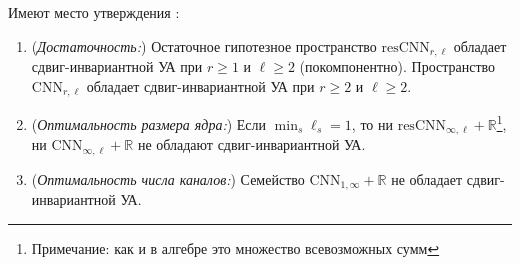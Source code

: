 \documentclass[../NDCNNAI_main.tex]{subfiles}
\begin{document}
\begin{theorem}
\label{thm:lls_main}
Имеют место утверждения \cite{Li_Lin_Shen2022}:
\begin{enumerate}
\item (\emph{Достаточность:}) Остаточное гипотезное пространство $\mathrm{resCNN}_{r,\ell}$ обладает сдвиг-инвариантной УА при $r\ge 1$ и $\ell\ge 2$ (покомпонентно).
Пространство $\mathrm{CNN}_{r,\ell}$ обладает сдвиг-инвариантной УА при $r\ge 2$ и $\ell\ge 2$.
\item (\emph{Оптимальность размера ядра:}) Если $\min_s \ell_s=1$, то ни $\mathrm{resCNN}_{\infty,\ell}+\mathbb{R}$\footnote{Примечание: как и в алгебре это множество всевозможных сумм}, ни $\mathrm{CNN}_{\infty,\ell}+\mathbb{R}$ не обладают сдвиг-инвариантной УА.
\item (\emph{Оптимальность числа каналов:}) Семейство $\mathrm{CNN}_{1,\infty}+\mathbb{R}$ не обладает сдвиг-инвариантной УА.
\end{enumerate}  
\end{theorem}
\end{document}
